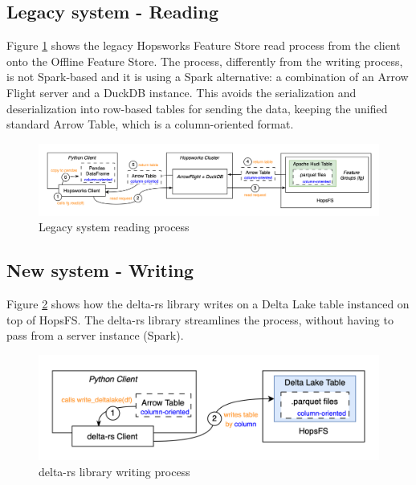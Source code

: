 \subsection{Legacy system - Reading}
\label{subsec:legacy_sys_reading}

Figure \ref{fig:featurestore_reading} shows the legacy Hopsworks Feature Store read process from the client onto the Offline Feature Store. The process, differently from the writing process, is not Spark-based and it is using a Spark alternative: a combination of an Arrow Flight server and a DuckDB instance. This avoids the serialization and deserialization into row-based tables for sending the data, keeping the unified standard Arrow Table, which is a column-oriented format.


\begin{figure}
    \begin{center}
      \includegraphics[width=\textwidth]{figures/2-background/FeatureStore-reading.png}
    \end{center}
    \caption{Legacy system reading process}
    \label{fig:featurestore_reading}
\end{figure}

\subsection{New system - Writing}

Figure \ref{fig:delta_rs_writing} shows how the delta-rs library writes on a Delta Lake table instanced on top of \gls{HopsFS}. The delta-rs library streamlines the process, without having to pass from a server instance (Spark).

\begin{figure}
    \begin{center}
      \includegraphics[width=\textwidth]{figures/2-background/delta-rs_writing.png}
    \end{center}
    \caption{delta-rs library writing process}
    \label{fig:delta_rs_writing}
\end{figure}

